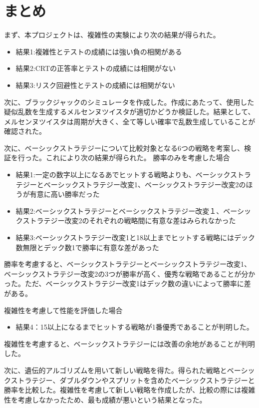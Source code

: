 \section{まとめ}
まず、本プロジェクトは、複雑性の実験により次の結果が得られた。
\begin{itemize}
    \item 結果1:複雑性とテストの成績には強い負の相関がある
    \item 結果2:CRTの正答率とテストの成績には相関がない
    \item 結果3:リスク回避性とテストの成績には相関がない
\end{itemize}

次に、ブラックジャックのシミュレータを作成した。作成にあたって、使用した疑似乱数を生成するメルセンヌツイスタが適切かどうか検証した。結果として、メルセンヌツイスタは周期が大きく、全て等しい確率で乱数生成していることが確認された。

次に、ベーシックストラテジーについて比較対象となる6つの戦略を考案し、検証を行った。これにより次の結果が得られた。
勝率のみを考慮した場合
\begin{itemize}
\item 結果1:一定の数字以上になるあでヒットする戦略よりも、ベーシックストラテジーとベーシックストラテジー改変1、ベーシックストラテジー改変2のほうが有意に高い勝率だった
\item 結果2:ベーシックストラテジーとベーシックストラテジー改変１、ベーシックストラテジー改変2のそれぞれの戦略間に有意な差はみられなかった
\item 結果3:ベーシックストラテジー改変1と18以上までヒットする戦略にはデック数無限とデック数1で勝率に有意な差があった
\end{itemize}

勝率を考慮すると、ベーシックストラテジーとベーシックストラテジー改変1、ベーシックストラテジー改変2の3つが勝率が高く、優秀な戦略であることが分かった。ただ、ベーシックストラテジー改変1はデック数の違いによって勝率に差がある。

複雑性を考慮して性能を評価した場合
\begin{itemize}
\item 結果4：15以上になるまでヒットする戦略が1番優秀であることが判明した。
\end{itemize}

複雑性を考慮すると、ベーシックストラテジーには改善の余地があることが判明した。

次に、遺伝的アルゴリズムを用いて新しい戦略を得た。得られた戦略とベーシックストラテジー、ダブルダウンやスプリットを含めたベーシックストラテジーと勝率を比較した。複雑性を考慮して新しい戦略を作成したが、比較の際には複雑性を考慮しなかったため、最も成績が悪いという結果となった。

